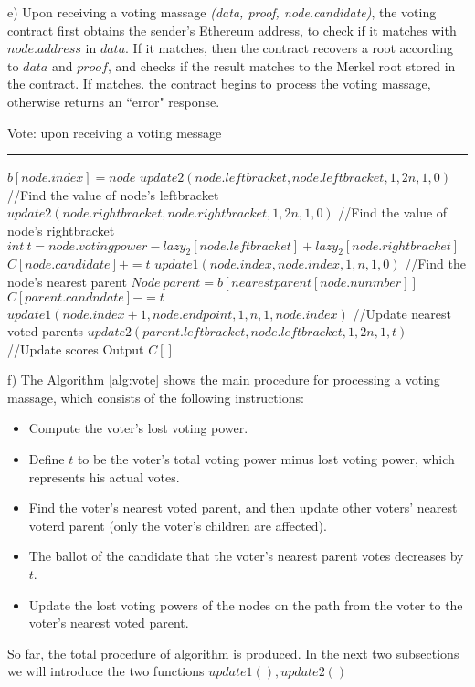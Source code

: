 e) Upon receiving a voting massage {\em(data, proof, node.candidate)}, the voting contract first obtains the sender's Ethereum address, to check if it matches with	 $node.address$ in $data$.   If it matches, then the contract recovers a root according to $data$ and $proof$, and checks if the result matches to the Merkel root stored in the contract. If matches. the contract begins to process the voting massage, otherwise returns an ``error" response.

\begin{algorithm}
	\caption{Vote: upon receiving a voting message}%
	\hrule
	
	$b[node.index]=node$\;
	$update2(node.leftbracket,node.leftbracket,1,2n,1,0)${\color{gray}
		//Find the value of node's leftbracket}\;
	$update2(node.rightbracket,node.rightbracket,1,2n,1,0)${\color{gray}
		//Find the value of node's rightbracket}\;
	$int~t=node.votingpower-lazy_2[node.leftbracket]+lazy_2[node.rightbracket]$\;
	$C[node.candidate]+=t$\;
	$update1(node.index,node.index,1,n,1,0)${\color{gray}
		//Find the node's nearest parent}\;
	$Node~parent = b[nearestparent[node.nunmber]]$\;
	$C[parent.candndate]-=t$\;
	$update1(node.index+1,node.endpoint,1,n,1,node.index)${\color{gray}
		//Update nearest voted parents}\;
	$update2(parent.leftbracket,node.leftbracket,1,2n,1,t)${\color{gray}
		\\//Update scores}\;
	Output $C[]$
	\label{alg:vote}
\end{algorithm}

f) The Algorithm \ref{alg:vote} shows the main procedure for processing a voting massage, which consists of the following instructions: 
\begin{itemize}
	\item Compute the voter's lost voting power.
	\item Define $t$ to be the voter's total voting power minus lost voting power, which represents his actual votes. 
	\item Find the voter's nearest voted parent, and then update other voters' nearest voterd parent (only the voter's children are affected).
	\item The ballot of the candidate that the voter's nearest parent votes decreases by $t$.
	\item Update the lost voting powers of the nodes on the path from the voter to the voter's nearest voted parent.
\end{itemize}
So far, the total procedure of algorithm is produced. In the next two subsections we will introduce the two functions $update1(),update2()$ 

